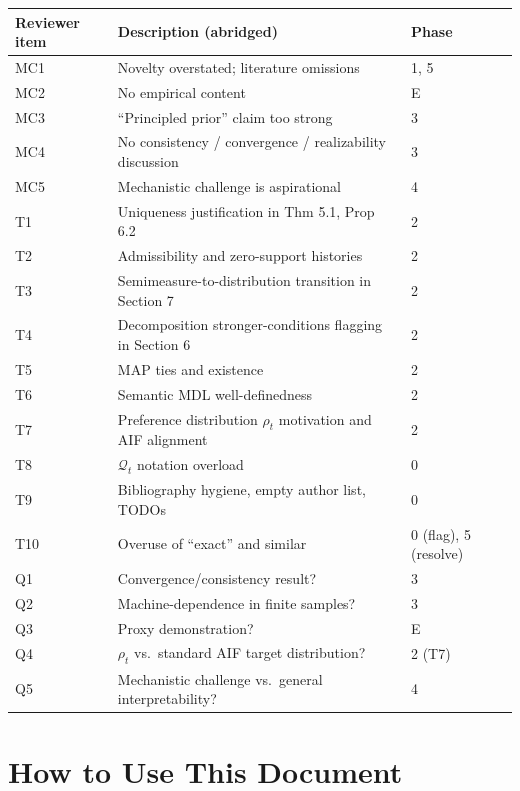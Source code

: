 \documentclass[11pt]{article}
\begin{document}
\begin{table}[h]
\centering
\renewcommand{\arraystretch}{1.1}
\begin{tabularx}{\textwidth}{@{}lXl@{}}
\toprule
\textbf{Reviewer item} & \textbf{Description (abridged)} & \textbf{Phase} \\
\midrule
MC1 & Novelty overstated; literature omissions & 1, 5 \\
MC2 & No empirical content & E \\
MC3 & ``Principled prior'' claim too strong & 3 \\
MC4 & No consistency / convergence / realizability discussion & 3 \\
MC5 & Mechanistic challenge is aspirational & 4 \\
T1 & Uniqueness justification in Thm 5.1, Prop 6.2 & 2 \\
T2 & Admissibility and zero-support histories & 2 \\
T3 & Semimeasure-to-distribution transition in Section 7 & 2 \\
T4 & Decomposition stronger-conditions flagging in Section 6 & 2 \\
T5 & MAP ties and existence & 2 \\
T6 & Semantic MDL well-definedness & 2 \\
T7 & Preference distribution $\rho_t$ motivation and AIF alignment & 2 \\
T8 & $\mathcal{Q}_t$ notation overload & 0 \\
T9 & Bibliography hygiene, empty author list, TODOs & 0 \\
T10 & Overuse of ``exact'' and similar & 0 (flag), 5 (resolve) \\
Q1 & Convergence/consistency result? & 3 \\
Q2 & Machine-dependence in finite samples? & 3 \\
Q3 & Proxy demonstration? & E \\
Q4 & $\rho_t$ vs.\ standard AIF target distribution? & 2 (T7) \\
Q5 & Mechanistic challenge vs.\ general interpretability? & 4 \\
\bottomrule
\end{tabularx}
\end{table}

\section{How to Use This Document}
\end{document}
